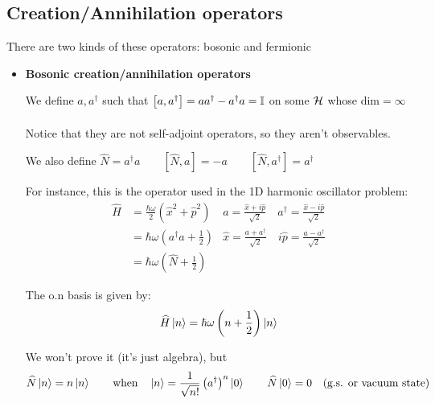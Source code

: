\subsection{Creation/Annihilation operators}
There are two kinds of these operators: bosonic and fermionic
\begin{itemize}
    \item \textbf{Bosonic creation/annihilation operators}
    
    We define $a, a^\dag$ such that $\left[a, a^\dag\right] = aa^\dag - a^\dag a = \mathbb{I}$ on some $\mathcal{H}$ whose dim$=\infty$\\
    \\
    Notice that they are not self-adjoint operators, so they aren't observables.

    We also define $\widehat N = a^\dag a \qquad \left[\widehat N, a \right] = -a \qquad \left[\widehat N, a^\dag\right] = a^\dag$
    
    For instance, this is the operator used in the 1D harmonic oscillator problem:
    \begin{align*}
    \widehat H &= \frac{\hbar\omega}2 \left(\hat x^2 + \hat p^2\right) &a = \frac{\hat x + i \hat p}{\sqrt 2} \quad a^\dag = \frac{\hat x - i \hat p}{\sqrt2} \\
    &= \hbar \omega \left(a^\dag a + \frac 12\right) &\hat x = \frac{a+a^\dag}{\sqrt2} \quad i\hat p = \frac{a- a^\dag}{\sqrt2} \\
    &= \hbar \omega \left(\widehat N + \frac 12\right)
    \end{align*}

    The o.n basis is given by:
    $$ \widehat H \left|n\right\rangle = \hbar \omega \left(n + \frac12\right) \left|n\right\rangle$$
    
    We won't prove it (it's just algebra), but 
    $$\widehat N \left|n\right\rangle = n\left|n\right\rangle  \qquad \text{when} \quad \left|n\right\rangle = \frac1{\sqrt{n!}}\left(a^\dag\right)^n \left|0\right\rangle \qquad \widehat N \left|0\right\rangle = 0 \quad \text{(g.s. or vacuum state)}$$


\end{itemize}
